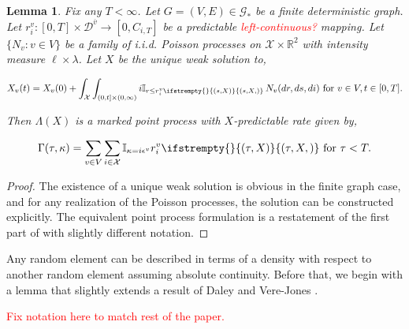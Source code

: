\documentclass[12pt]{article}
\newcommand{\mb}{\mathbb}
\newcommand{\mc}{\mathcal}
\newcommand{\ra}{\rightarrow}
\newcommand{\ov}{\overline}
\newcommand{\te}{\text}
\newcommand{\ep}{\epsilon}
\newcommand{\tr}{\textcolor{red}}
\newcommand{\cad}{\mc{D}}							%
\newcommand{\sta}{\mc{X}}							%
\newcommand{\cl}[1]{\ov{#1}}						%
\newcommand{\Xf}{X}									%
\newcommand{\poiss}{N}								%
\newcommand{\leb}{\lambda}							%
\newcommand{\Sm}{\ell}								%
\newcommand{\rate}{r}								%
\newcommand{\poissv}[1]{_{#1}}						%
\newcommand{\vind}[1]{_{#1}}						%
\newcommand{\tme}[1]{(#1)}							%
\newcommand{\vpara}[1]{^{#1}}						%
\newcommand{\stpara}[1]{_{#1}}						%
\newcommand{\jumpibd}[2]{C_{#1,#2}}					%
\newcommand{\Gs}{\mc{G}_\ast}						%
\newcommand{\tmepro}[3]{
\ifstrempty{#3}{
	\left(#1,#2\right)}{
	\left(#1,#2,#3\right)}}							%
\newcommand{\pmap}{\Lambda}							%
\newcommand{\rt}{\tau}								%
\renewcommand{\mark}{\kappa}						%
\newcommand{\ratee}{\Gamma}							%
\newcommand{\ev}[1]{\ep^{#1}}						%
\newtheorem{lem}[thms]{Lemma}
\begin{document}
\begin{lem}
Fix any \(T < \infty\). Let \(G  = (V,E) \in \Gs\) be a finite deterministic graph. Let \(\rate\vpara{v}\stpara{i}: [0,T] \times \cad\vpara{\cl{v}} \ra [0,\jumpibd{i}{T}]\) be a predictable \tr{left-continuous?} mapping. Let \(\{\poiss\poissv{v}:v \in V\}\) be a family of i.i.d. Poisson processes on \(\sta\times \mb{R}^2\) with intensity measure \(\Sm\times\leb\). Let \(\Xf\) be the unique weak solution to,

\begin{equation}
\Xf\vind{v}\tme{t} = \Xf\vind{v}\tme{0} + \int_\sta\int_{(0,t]\times (0,\infty)} i\mb{I}_{r \leq \rate\vpara{v}\stpara{i}\tmepro{s}{\Xf}{}}\,\poiss\poissv{v}(dr,ds,di)\te{ for } v \in V, t \in [0,T].
\label{ref::pro}
\end{equation}

Then \(\pmap(\Xf)\) is a marked point process with \(\Xf\)-predictable rate given by,

\begin{equation}
\ratee(\rt,\mark) = \sum_{v \in V} \sum_{i \in \sta} \mb{I}_{\mark = i\ev{v}} \rate\vpara{v}\stpara{i}\tmepro{\rt}{\Xf}{} \te{ for } \rt < T.
\label{ref::poi}
\end{equation}

\label{ref::propoi}
\end{lem}
\begin{proof}
The existence of a unique weak solution is obvious in the finite graph case, and for any realization of the Poisson processes, the solution can be constructed explicitly. The equivalent point process formulation is a restatement of the first part of \cite[exercise 14.7.I]{DalVer08} with slightly different notation.
\end{proof}

Any random element can be described in terms of a density with respect to another random element assuming absolute continuity. Before that, we begin with a lemma that slightly extends a result of Daley and Vere-Jones \cite{DalVer08}.

\tr{Fix notation here to match rest of the paper.}
\end{document}

